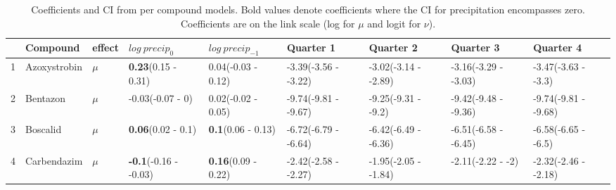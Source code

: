 \begingroup\fontsize{8pt}{10pt}\selectfont
\begin{longtable}{lp{2cm}p{0.6cm}p{1.8cm}p{1.8cm}p{1.8cm}p{1.8cm}p{1.8cm}p{1.8cm}}
\caption{Coefficients and CI from per compound models. 
                     Bold values denote coefficients where the CI for precipitation encompasses zero.
                     Coefficients are on the link scale (log for $\mu$ and logit for $\nu$).} \\ 
  \toprule
 & Compound & effect & $log~precip_0$ & $log~precip_{-1}$ & Quarter 1 & Quarter 2 & Quarter 3 & Quarter 4 \\ 
  \midrule
1 & Azoxystrobin & $\mu$ & \textbf{0.23}\newline (0.15 - 0.31) & 0.04\newline (-0.03 - 0.12) & -3.39\newline (-3.56 - -3.22) & -3.02\newline (-3.14 - -2.89) & -3.16\newline (-3.29 - -3.03) & -3.47\newline (-3.63 - -3.3) \\ 
  2 & Bentazon & $\mu$ & -0.03\newline (-0.07 - 0) & 0.02\newline (-0.02 - 0.05) & -9.74\newline (-9.81 - -9.67) & -9.25\newline (-9.31 - -9.2) & -9.42\newline (-9.48 - -9.36) & -9.74\newline (-9.81 - -9.68) \\ 
  3 & Boscalid & $\mu$ & \textbf{0.06}\newline (0.02 - 0.1) & \textbf{0.1}\newline (0.06 - 0.13) & -6.72\newline (-6.79 - -6.64) & -6.42\newline (-6.49 - -6.36) & -6.51\newline (-6.58 - -6.45) & -6.58\newline (-6.65 - -6.5) \\ 
  4 & Carbendazim & $\mu$ & \textbf{-0.1}\newline (-0.16 - -0.03) & \textbf{0.16}\newline (0.09 - 0.22) & -2.42\newline (-2.58 - -2.27) & -1.95\newline (-2.05 - -1.84) & -2.11\newline (-2.22 - -2) & -2.32\newline (-2.46 - -2.18) \\ 

\end{longtable}
